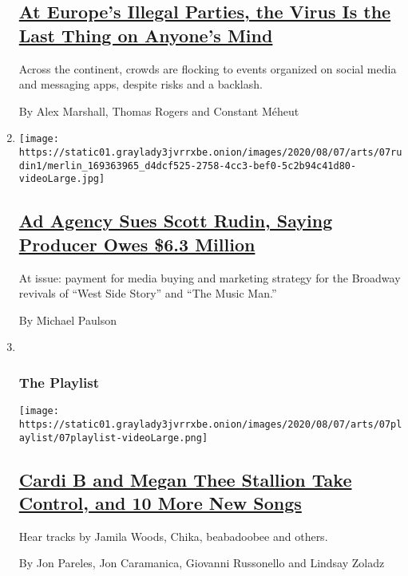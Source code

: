 \begin{enumerate}
{  \subsection{\texorpdfstring{\href{/2020/08/07/arts/music/illegal-parties-coronavirus-europe.html}{At
  Europe's Illegal Parties, the Virus Is the Last Thing on Anyone's
  Mind}}{At Europe's Illegal Parties, the Virus Is the Last Thing on Anyone's Mind}}\label{at-europes-illegal-parties-the-virus-is-the-last-thing-on-anyones-mind}}

  Across the continent, crowds are flocking to events organized on
  social media and messaging apps, despite risks and a backlash.

  By Alex Marshall, Thomas Rogers and Constant Méheut
\item
  \texttt{[image: https://static01.graylady3jvrrxbe.onion/images/2020/08/07/arts/07rudin1/merlin\_169363965\_d4dcf525-2758-4cc3-bef0-5c2b94c41d80-videoLarge.jpg]}

  \hypertarget{ad-agency-sues-scott-rudin-saying-producer-owes-63-million}{%
  \subsection{\texorpdfstring{\href{/2020/08/07/theater/scott-rudin-spotco-broadway-lawsuit.html}{Ad
  Agency Sues Scott Rudin, Saying Producer Owes \$6.3
  Million}}{Ad Agency Sues Scott Rudin, Saying Producer Owes \$6.3 Million}}\label{ad-agency-sues-scott-rudin-saying-producer-owes-63-million}}

  At issue: payment for media buying and marketing strategy for the
  Broadway revivals of ``West Side Story'' and ``The Music Man.''

  By Michael Paulson
\item ~
  \hypertarget{the-playlist}{%
  \subsubsection{The Playlist}\label{the-playlist}}

  \texttt{[image: https://static01.graylady3jvrrxbe.onion/images/2020/08/07/arts/07playlist/07playlist-videoLarge.png]}

  \hypertarget{cardi-b-and-megan-thee-stallion-take-control-and-10-more-new-songs}{%
  \subsection{\texorpdfstring{\href{/2020/08/07/arts/music/playlist-cardi-b-megan-thee-stallion.html}{Cardi
  B and Megan Thee Stallion Take Control, and 10 More New
  Songs}}{Cardi B and Megan Thee Stallion Take Control, and 10 More New Songs}}\label{cardi-b-and-megan-thee-stallion-take-control-and-10-more-new-songs}}

  Hear tracks by Jamila Woods, Chika, beabadoobee and others.

  By Jon Pareles, Jon Caramanica, Giovanni Russonello and Lindsay Zoladz
\end{enumerate}

